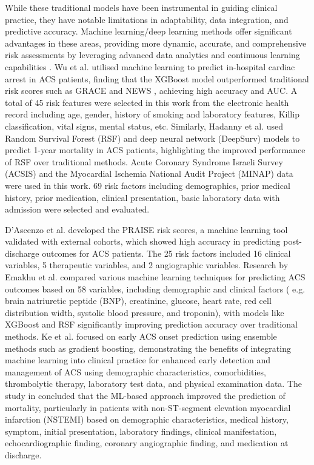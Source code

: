While these traditional models have been instrumental in guiding clinical practice, they have notable limitations in adaptability, data integration, and predictive accuracy.  Machine learning/deep learning methods offer significant advantages in these areas, providing more dynamic, accurate, and comprehensive risk assessments by leveraging advanced data analytics and continuous learning capabilities \cite{Ke2022Machine}.  Wu et al. \cite{Wu2021Machine} utilised machine learning to predict in-hospital cardiac arrest in ACS patients, finding that the XGBoost model outperformed traditional risk scores such as GRACE and NEWS , achieving high accuracy and AUC. A total of 45 risk features were selected in this work from the electronic health record including age, gender, history of smoking and laboratory features, Killip classification, vital signs, mental status, etc.  Similarly, Hadanny et al. \cite{Hadanny2022Machine} used Random Survival Forest (RSF) and deep neural network (DeepSurv) models to predict 1-year mortality in ACS patients, highlighting the improved performance of RSF over traditional methods. Acute Coronary Syndrome Israeli Survey (ACSIS) and the Myocardial Ischemia National Audit Project (MINAP) data were used in this work. 69 risk factors including demographics, prior medical history, prior medication, clinical presentation, basic laboratory data with admission were selected and evaluated.

D’Ascenzo et al. \cite{D2021Machine} developed the PRAISE risk scores, a machine learning tool validated with external cohorts, which showed high accuracy in predicting post-discharge outcomes for ACS patients. The 25 risk factors included 16 clinical variables, 5 therapeutic variables, and 2 angiographic variables. Research by Emakhu et al. \cite{Emakhu2022Acute} compared various machine learning techniques for predicting ACS outcomes based on 58 variables, including demographic and clinical factors ( e.g. brain natriuretic peptide (BNP), creatinine, glucose, heart rate, red cell distribution width, systolic blood pressure, and troponin), with models like XGBoost and RSF significantly improving prediction accuracy over traditional methods. Ke et al. \cite{Ke2022Machine} focused on early ACS onset prediction using ensemble methods such as gradient boosting, demonstrating the benefits of integrating machine learning into clinical practice for enhanced early detection and management of ACS using demographic characteristics, comorbidities, thrombolytic therapy, laboratory test data, and physical examination data. The study in \cite{Lee2021Machine} concluded that the ML-based approach improved the prediction of mortality, particularly in patients with non-ST-segment elevation myocardial infarction (NSTEMI) based on demographic characteristics, medical history, symptom, initial presentation, laboratory findings, clinical manifestation, echocardiographic finding, coronary angiographic finding, and medication at discharge. 

